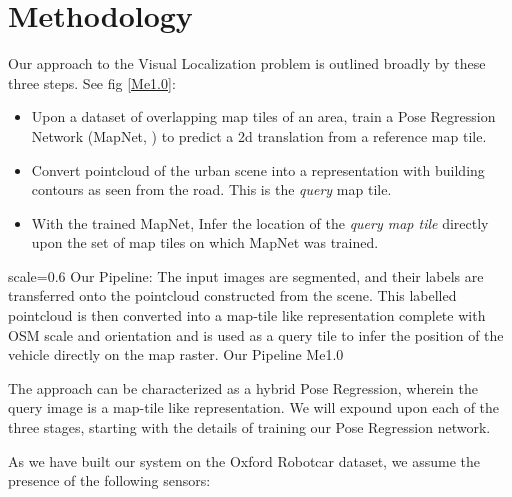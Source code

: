 
\chapter{Methodology}
\label{Methodology}
Our approach to the Visual Localization problem is outlined broadly by these three steps. See fig \ref{Me1.0}:

\begin{itemize}
	\item Upon a dataset of overlapping map tiles of an area, train a Pose Regression Network (MapNet, \cite{Brahmbhatt2018}) to predict a 2d translation from a reference map tile. \\
	
	\item Convert pointcloud of the urban scene into a representation with building contours as seen from the road. This is the \emph{query} map tile.\\
	
	\item With the trained MapNet, Infer the location of the \emph{query map tile} directly upon the set of map tiles on which MapNet was trained.\\  
\end{itemize}

{scale=0.6}%
{Our Pipeline: The input images are segmented, and their labels are transferred onto the pointcloud constructed from the scene. This labelled pointcloud is then converted into a map-tile like representation complete with OSM scale and orientation and is used as a query tile to infer the position of the vehicle directly on the map raster.}%
{Our Pipeline}%
{Me1.0} 

The approach can be characterized as a hybrid Pose Regression, wherein the query image is a map-tile like representation. We will expound upon each of the three stages, starting with the details of training our Pose Regression network.   

As we have built our system on the Oxford Robotcar dataset, we assume the presence of the following sensors:

